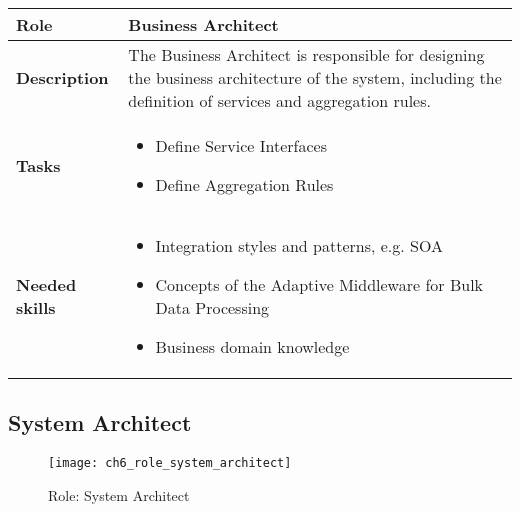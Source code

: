 \begin{tabularx}{\textwidth}{@{} l X @{}}
	\caption{Business Architect} \label{table:ch6_Role_Business_Analysist}\\
	\toprule
	\bfseries Role & Business Architect\\
	\midrule
	\bfseries Description & The Business Architect is responsible for designing the business architecture of the system, including the definition of services and aggregation rules.\\
	\midrule
	\bfseries Tasks & 
	\begin{itemize}
		\item Define Service Interfaces
		\item Define Aggregation Rules
	\end{itemize}
	\\
	\midrule 
	\bfseries Needed skills &
	\begin{itemize}
		\item Integration styles and patterns, e.g. \ac{SOA}
		\item Concepts of the Adaptive Middleware for Bulk Data Processing
		\item Business domain knowledge
	\end{itemize}
	\\
	\bottomrule
\end{tabularx}

\subsection{System Architect} 

\begin{figure}[htpb] \centering 
	\texttt{[image: ch6\_role\_system\_architect]} 
	\caption{Role: System Architect} 
	\label{fig:ch6_role_system_architect} 
\end{figure}

\newpage

